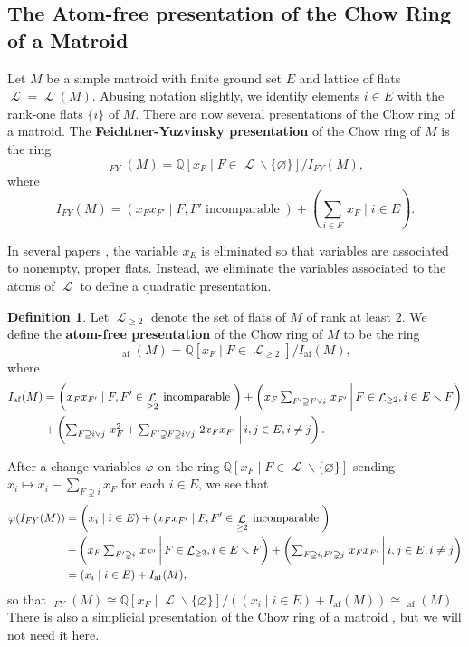 \documentclass[11pt, reqno]{amsart}
\DeclareMathOperator{\atomfree}{af}
\newcommand{\af}{{\atomfree}}
\DeclareMathOperator{\Chow}{\underline{CH}}		%
\renewcommand{\emptyset}{\varnothing}
\newcommand{\iso}{\cong}
\DeclareMathOperator{\LL}{\mathcal{L}}
\renewcommand{\phi}{\varphi}
\newcommand{\QQ}{\mathbb{Q}}
\renewcommand{\setminus}{\smallsetminus}
\newcommand{\term}[1]{\textbf{\textsf{#1}}}
\theoremstyle{definition}
\newtheorem{defn}[thm]{Definition}
\numberwithin{equation}{section}
\numberwithin{table}{section}
\begin{document}
\begin{spacing}{1.1}
\subsection{The Atom-free presentation of the Chow Ring of a Matroid}\label{SSchow}

Let $M$ be a simple matroid with finite ground set $E$ and lattice of flats $\LL = \LL(M)$.  Abusing notation slightly, we identify elements $i \in E$ with the rank-one flats $\{i\}$ of $M$.  There are now several presentations of the Chow ring of a matroid.  The \term{Feichtner-Yuzvinsky presentation} of the Chow ring of $M$ \cite{FY04} is the ring
\[ \Chow_{FY}(M) = \QQ\left[x_F \mid F \in \LL \smallsetminus \{\emptyset\} \right]/I_{FY}(M), \]
where
\[ I_{FY}(M) = \left(x_Fx_{F'} \mid F, F' \; \text{incomparable}\;\right) + \left(\textstyle \sum_{i \in F}\, x_F \mid i \in E\right). \] 

In several papers \cite{AHK18, BHMPW20a, BHMPW20b}, the variable $x_E$ is eliminated so that  variables are associated to nonempty, proper flats.  Instead, we eliminate the variables associated to the atoms of $\LL$ to define a quadratic presentation.

\begin{defn}
Let $\LL_{\geq 2}$ denote the set of flats of $M$ of rank at least 2.  We define the \term{atom-free presentation} of the Chow ring of $M$ to be the ring
\[ \Chow_\af(M) = \QQ[x_F \mid F \in \LL_{\geq 2} ]/I_\af(M), \] 
where
\begin{align*} 
I_\af(M) 
&= \left(x_Fx_{F'} \mid F, F' \in \LL_{\geq 2} \; \text{incomparable}\;\right)  + \left( \textstyle x_F \sum_{F' \supseteq F \vee i} \, x_{F'} \,\bigg{\rvert}\, F \in \LL_{\geq 2}, i \in E \setminus F \right) \\
&+ \left(\textstyle \sum_{F \supseteq i \vee j} \, x_F^2 + \sum_{F' \supsetneq F \supseteq i \vee j}  \, 2x_Fx_{F'} \,\bigg{\rvert}\, i, j \in E, i \neq j\right).
\end{align*}
\end{defn}

After a change variables $\phi$ on the ring $\QQ[x_F \mid F \in \LL \setminus \{\emptyset\}]$ sending $x_i \mapsto x_i - \sum_{F \supsetneq i} x_F$ for each $i \in E$, we see that 
\begin{align} 
\begin{split} \label{change:of:variables}
\phi(I_{FY}(M)) &= \left(x_i \mid i \in E) + (x_Fx_{F'} \mid F, F' \in \LL_{\geq 2} \; \text{incomparable}\;\right)  \\ 
&+ \left( \textstyle x_F\sum_{F' \supsetneq i} \, x_{F'} \,\bigg{\rvert}\, F \in \LL_{\geq 2}, i \in E \setminus F \right) + \left(\textstyle \sum_{F \supsetneq i, F' \supsetneq j} \, x_Fx_{F'} \,\bigg{\rvert}\, i, j \in E, i \neq j \right) 
\\
&= \left(x_i \mid i \in E \right) + I_\af(M),
\end{split}
\end{align}
so that $\Chow_{FY}(M) \iso \QQ[x_F \mid \LL \setminus \{\emptyset\}]/((x_i \mid i \in E) + I_\af(M)) \iso \Chow_\af(M)$.
There is also a simplicial presentation of the Chow ring of a matroid \cite{BES20}, but we will not need it here.


\end{spacing}
\end{document}
